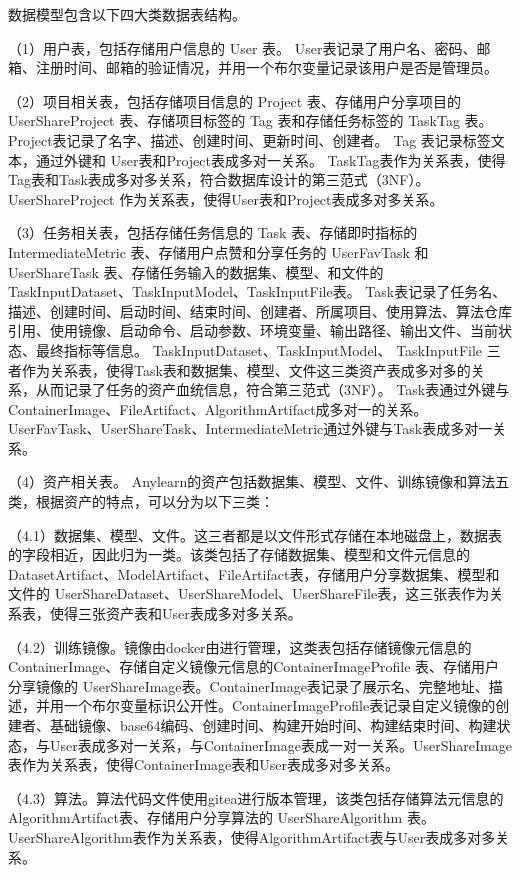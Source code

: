 数据模型包含以下四大类数据表结构。

（1）用户表，包括存储用户信息的 User 表。
User表记录了用户名、密码、邮箱、注册时间、邮箱的验证情况，并用一个布尔变量记录该用户是否是管理员。

（2）项目相关表，包括存储项目信息的 Project 表、存储用户分享项目的 UserShareProject 表、存储项目标签的 Tag 表和存储任务标签的 TaskTag 表。
Project表记录了名字、描述、创建时间、更新时间、创建者。
Tag 表记录标签文本，通过外键和 User表和Project表成多对一关系。
TaskTag表作为关系表，使得Tag表和Task表成多对多关系，符合数据库设计的第三范式（3NF）。
UserShareProject 作为关系表，使得User表和Project表成多对多关系。

（3）任务相关表，包括存储任务信息的 Task 表、存储即时指标的 IntermediateMetric 表、存储用户点赞和分享任务的 UserFavTask 和 UserShareTask 表、存储任务输入的数据集、模型、和文件的 TaskInputDataset、TaskInputModel、TaskInputFile表。
Task表记录了任务名、描述、创建时间、启动时间、结束时间、创建者、所属项目、使用算法、算法仓库引用、使用镜像、启动命令、启动参数、环境变量、输出路径、输出文件、当前状态、最终指标等信息。
TaskInputDataset、TaskInputModel、 TaskInputFile 三者作为关系表，使得Task表和数据集、模型、文件这三类资产表成多对多的关系，从而记录了任务的资产血统信息，符合第三范式（3NF）。
Task表通过外键与ContainerImage、FileArtifact、AlgorithmArtifact成多对一的关系。
UserFavTask、UserShareTask、IntermediateMetric通过外键与Task表成多对一关系。

（4）资产相关表。
Anylearn的资产包括数据集、模型、文件、训练镜像和算法五类，根据资产的特点，可以分为以下三类：

（4.1）数据集、模型、文件。这三者都是以文件形式存储在本地磁盘上，数据表的字段相近，因此归为一类。该类包括了存储数据集、模型和文件元信息的 DatasetArtifact、ModelArtifact、FileArtifact表，存储用户分享数据集、模型和文件的 UserShareDataset、UserShareModel、UserShareFile表，这三张表作为关系表，使得三张资产表和User表成多对多关系。

（4.2）训练镜像。镜像由docker由进行管理，这类表包括存储镜像元信息的 ContainerImage、存储自定义镜像元信息的ContainerImageProfile 表、存储用户分享镜像的 UserShareImage表。ContainerImage表记录了展示名、完整地址、描述，并用一个布尔变量标识公开性。ContainerImageProfile表记录自定义镜像的创建者、基础镜像、base64编码、创建时间、构建开始时间、构建结束时间、构建状态，与User表成多对一关系，与ContainerImage表成一对一关系。UserShareImage表作为关系表，使得ContainerImage表和User表成多对多关系。

（4.3）算法。算法代码文件使用gitea进行版本管理，该类包括存储算法元信息的 AlgorithmArtifact表、存储用户分享算法的 UserShareAlgorithm 表。UserShareAlgorithm表作为关系表，使得AlgorithmArtifact表与User表成多对多关系。

